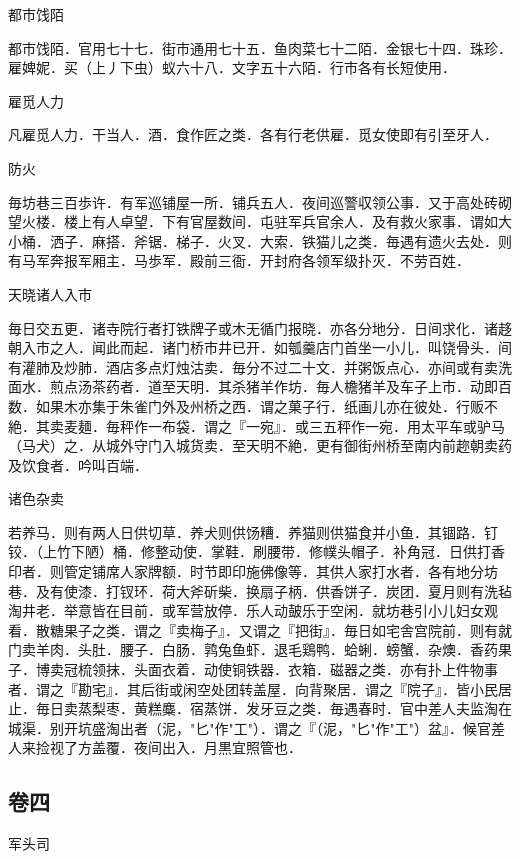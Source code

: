 \documentclass[]{article}
\begin{document}
都市饯陌

都市饯陌．官用七十七．街市通用七十五．鱼肉菜七十二陌．金银七十四．珠珍．雇婢妮．买（上丿下虫）蚁六十八．文字五十六陌．行市各有长短使用．

雇觅人力

凡雇觅人力．干当人．酒．食作匠之类．各有行老供雇．觅女使即有引至牙人．

防火

毎坊巷三百歩许．有军巡铺屋一所．铺兵五人．夜间巡警収领公事．又于高处砖砌望火楼．楼上有人卓望．下有官屋数间．屯驻军兵官余人．及有救火家事．谓如大小桶．洒子．麻搭．斧锯．梯子．火叉．大索．铁猫儿之类．毎遇有遗火去处．则有马军奔报军厢主．马歩军．殿前三衙．开封府各领军级扑灭．不劳百姓．

天晓诸人入市

毎日交五更．诸寺院行者打铁牌子或木无循门报晓．亦各分地分．日间求化．诸趍朝入市之人．闻此而起．诸门桥市井已开．如瓠羹店门首坐一小儿．叫饶骨头．间有灌肺及炒肺．酒店多点灯烛沽卖．毎分不过二十文．并粥饭点心．亦间或有卖洗面水．煎点汤茶药者．道至天明．其杀猪羊作坊．毎人檐猪羊及车子上市．动即百数．如果木亦集于朱雀门外及州桥之西．谓之菓子行．纸画儿亦在彼处．行贩不絶．其卖麦麺．毎秤作一布袋．谓之『一宛』．或三五秤作一宛．用太平车或驴马（马犬）之．从城外守门入城货卖．至天明不絶．更有御街州桥至南内前趂朝卖药及饮食者．吟叫百端．

诸色杂卖

若养马．则有两人日供切草．养犬则供饧糟．养猫则供猫食并小鱼．其锢路．钉铰．（上竹下陋）桶．修整动使．掌鞋．刷腰带．修幞头帽子．补角冠．日供打香印者．则管定铺席人家牌额．时节即印施佛像等．其供人家打水者．各有地分坊巷．及有使漆．打钗环．荷大斧斫柴．换扇子柄．供香饼子．炭团．夏月则有洗毡淘井老．举意皆在目前．或军营放停．乐人动皷乐于空闲．就坊巷引小儿妇女观看．散糖果子之类．谓之『卖梅子』．又谓之『把街』．毎日如宅舎宫院前．则有就门卖羊肉．头肚．腰子．白肠．鹑兔鱼虾．退毛鶏鸭．蛤蜊．螃蟹．杂燠．香药果子．博卖冠梳领抹．头面衣着．动使铜铁器．衣箱．磁器之类．亦有扑上件物事者．谓之『勘宅』．其后街或闲空处团转盖屋．向背聚居．谓之『院子』．皆小民居止．毎日卖蒸梨枣．黄糕麋．宿蒸饼．发牙豆之类．毎遇春时．官中差人夫监淘在城渠．别开坑盛淘出者（泥，"匕"作"工"）．谓之『（泥，"匕"作"工"）盆』．候官差人来捡视了方盖覆．夜间出入．月黒宜照管也．

\hypertarget{header-n73}{%
\subsection{卷四}\label{header-n73}}

军头司
\end{document}
